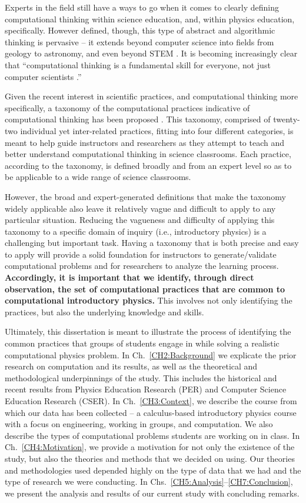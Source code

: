 \documentclass{msuphddissertation}
\begin{document}
\begin{doublespace}
Experts in the field still have a ways to go when it comes to clearly defining computational thinking within science education, and, within physics education, specifically.  However defined, though, this type of abstract and algorithmic thinking is pervasive -- it extends beyond computer science into fields from geology to astronomy, and even beyond STEM \cite{Bundy2007}.  It is becoming increasingly clear that ``computational thinking is a fundamental skill for everyone, not just computer scientists \cite{Wing2006}.''

Given the recent interest in scientific practices, and computational thinking more specifically, a taxonomy of the computational practices indicative of computational thinking has been proposed \cite{Weintrop2015}.  This taxonomy, comprised of twenty-two individual yet inter-related practices, fitting into four different categories, is meant to help guide instructors and researchers as they attempt to teach and better understand computational thinking in science classrooms.  Each practice, according to the taxonomy, is defined broadly and from an expert level so as to be applicable to a wide range of science classrooms.

However, the broad and expert-generated definitions that make the taxonomy widely applicable also leave it relatively vague and difficult to apply to any particular situation.  Reducing the vagueness and difficulty of applying this taxonomy to a specific domain of inquiry (i.e., introductory physics) is a challenging but important task.  Having a taxonomy that is both precise and easy to apply will provide a solid foundation for instructors to generate/validate computational problems and for researchers to analyze the learning process.  \textbf{Accordingly, it is important that we identify, through direct observation, the set of computational practices that are common to computational introductory physics.}  This involves not only identifying the practices, but also the underlying knowledge and skills.

Ultimately, this dissertation is meant to illustrate the process of identifying the common practices that groups of students engage in while solving a realistic computational physics problem.  In Ch.~\ref{CH2:Background} we explicate the prior research on computation and its results, as well as the theoretical and methodological underpinnings of the study.  This includes the historical and recent results from Physics Education Research (PER) and Computer Science Education Research (CSER).  In Ch.~\ref{CH3:Context}, we describe the course from which our data has been collected -- a calculus-based introductory physics course with a focus on engineering, working in groups, and computation.  We also describe the types of computational problems students are working on in class.  In Ch.~\ref{CH4:Motivation}, we provide a motivation for not only the existence of the study, but also the theories and methods that we decided on using.  Our theories and methodologies used depended highly on the type of data that we had and the type of research we were conducting.  In Chs.~\ref{CH5:Analysis}--\ref{CH7:Conclusion}, we present the analysis and results of our current study with concluding remarks.


\end{doublespace}
\end{document}
